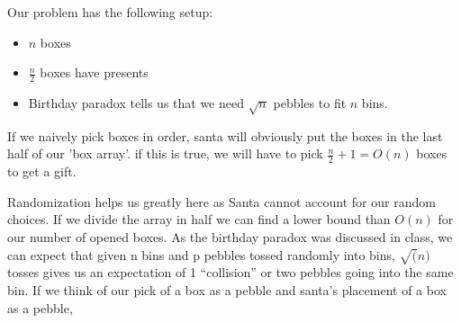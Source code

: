 \documentclass[titlepage]{article}\usepackage[]{graphicx}\usepackage[]{color}
\begin{document}
Our problem has the following setup:

\begin{itemize}
	\item $n$ boxes
	\item $\frac{n}{2}$ boxes have presents
	\item Birthday paradox tells us that we need $\sqrt{n}$ pebbles to fit
		$n$ bins. 
\end{itemize}

If we naively pick boxes in order, santa will obviously put the boxes in the
last half of our 'box array'. if this is true, we will have to pick
$\frac{n}{2} + 1 = O(n)$ boxes to get a gift. 

Randomization helps us greatly here as Santa cannot account for our random
choices. If we divide the array in half we can find a lower bound than $O(n)$
for our number of opened boxes. 
As the birthday paradox was discussed in class, we can expect that given n bins
and p pebbles tossed randomly into bins, $\sqrt(n)$ tosses gives us an
expectation of 1 ``collision'' or two pebbles going into the same bin. If we
think of our pick of a box as a pebble and santa's placement of a box as a
pebble, 
\end{document}

